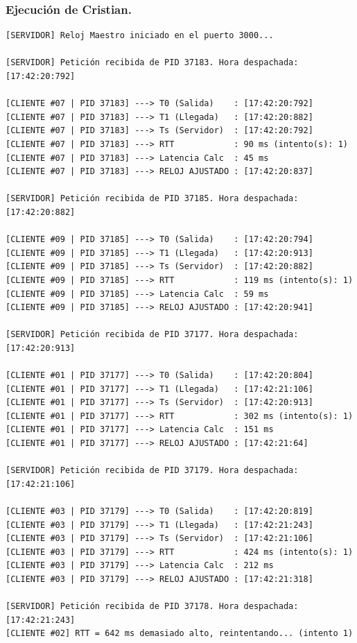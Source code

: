 \subsubsection{Ejecución de Cristian.}

\begin{lstlisting}[style=estiloC]
[SERVIDOR] Reloj Maestro iniciado en el puerto 3000...

[SERVIDOR] Petición recibida de PID 37183. Hora despachada: [17:42:20:792]

[CLIENTE #07 | PID 37183] ---> T0 (Salida)    : [17:42:20:792]
[CLIENTE #07 | PID 37183] ---> T1 (Llegada)   : [17:42:20:882]
[CLIENTE #07 | PID 37183] ---> Ts (Servidor)  : [17:42:20:792]
[CLIENTE #07 | PID 37183] ---> RTT            : 90 ms (intento(s): 1)
[CLIENTE #07 | PID 37183] ---> Latencia Calc  : 45 ms
[CLIENTE #07 | PID 37183] ---> RELOJ AJUSTADO : [17:42:20:837]

[SERVIDOR] Petición recibida de PID 37185. Hora despachada: [17:42:20:882]

[CLIENTE #09 | PID 37185] ---> T0 (Salida)    : [17:42:20:794]
[CLIENTE #09 | PID 37185] ---> T1 (Llegada)   : [17:42:20:913]
[CLIENTE #09 | PID 37185] ---> Ts (Servidor)  : [17:42:20:882]
[CLIENTE #09 | PID 37185] ---> RTT            : 119 ms (intento(s): 1)
[CLIENTE #09 | PID 37185] ---> Latencia Calc  : 59 ms
[CLIENTE #09 | PID 37185] ---> RELOJ AJUSTADO : [17:42:20:941]

[SERVIDOR] Petición recibida de PID 37177. Hora despachada: [17:42:20:913]

[CLIENTE #01 | PID 37177] ---> T0 (Salida)    : [17:42:20:804]
[CLIENTE #01 | PID 37177] ---> T1 (Llegada)   : [17:42:21:106]
[CLIENTE #01 | PID 37177] ---> Ts (Servidor)  : [17:42:20:913]
[CLIENTE #01 | PID 37177] ---> RTT            : 302 ms (intento(s): 1)
[CLIENTE #01 | PID 37177] ---> Latencia Calc  : 151 ms
[CLIENTE #01 | PID 37177] ---> RELOJ AJUSTADO : [17:42:21:64]

[SERVIDOR] Petición recibida de PID 37179. Hora despachada: [17:42:21:106]

[CLIENTE #03 | PID 37179] ---> T0 (Salida)    : [17:42:20:819]
[CLIENTE #03 | PID 37179] ---> T1 (Llegada)   : [17:42:21:243]
[CLIENTE #03 | PID 37179] ---> Ts (Servidor)  : [17:42:21:106]
[CLIENTE #03 | PID 37179] ---> RTT            : 424 ms (intento(s): 1)
[CLIENTE #03 | PID 37179] ---> Latencia Calc  : 212 ms
[CLIENTE #03 | PID 37179] ---> RELOJ AJUSTADO : [17:42:21:318]

[SERVIDOR] Petición recibida de PID 37178. Hora despachada: [17:42:21:243]
[CLIENTE #02] RTT = 642 ms demasiado alto, reintentando... (intento 1)


\end{lstlisting}
